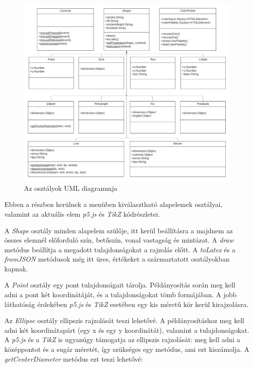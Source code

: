 \begin{figure}[!h]
	\includegraphics[width=\textwidth]{images/uml.png}
	\caption{Az osztályok UML diagrammja}
	\label{fig:uml}
\end{figure}


Ebben a részben kerülnek a menüben kiválasztható alapelemek osztályai, valamint az aktuális elem \textit{p5.js} és \textit{TikZ} kódrészletei. 


A \textit{Shape} osztály minden alapelem szülője, itt kerül beállításra a majdnem az összes elemnél előforduló szín, betűszín, vonal vastagság és mintázat. A \textit{draw} metódus beállítja a megadott tulajdonságokat a rajzolás előtt. A \textit{toLatex} és a \textit{fromJSON} metódusok még itt üres, értékeket a származtatott osztályokban kapnak.


A \textit{Point} osztály egy pont tulajdonságait tárolja. Példányosítás során meg kell adni a pont két koordinátáját, és a tulajdonságokat tömb formájában. A jobb láthatóság érdekében \textit{p5.js} és \textit{TikZ} esetében egy kis méretű kör kerül kirajzolásra. 


Az \textit{Ellipse} osztály ellipszis rajzolását teszi lehetővé. A példányosításhoz meg kell adni két koordinátapárt (egy x és egy y koordinátát), valamint a tulajdonságokat. A \textit{p5.js} és a \textit{TikZ} is ugyanúgy támogatja az ellipszis rajzolását: meg kell adni a középpontot és a sugár méretét, így szükséges egy metódus, ami ezt kiszámolja. A \textit{getCenterDiameter} metódus ezt teszi lehetővé:

